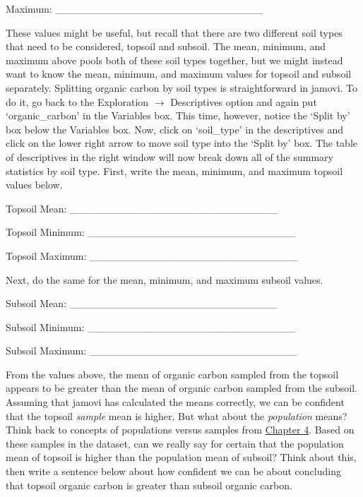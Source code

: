 \documentclass[
  openany]{scrbook}
\begin{document}
Maximum: \_\_\_\_\_\_\_\_\_\_\_\_\_\_\_\_\_\_\_\_\_\_\_\_\_\_\_\_

These values might be useful, but recall that there are two different soil types that need to be considered, topsoil and subsoil.
The mean, minimum, and maximum above pools both of these soil types together, but we might instead want to know the mean, minimum, and maximum values for topsoil and subsoil separately.
Splitting organic carbon by soil types is straightforward in jamovi.
To do it, go back to the Exploration \(\to\) Descriptives option and again put `organic\_carbon' in the Variables box.
This time, however, notice the `Split by' box below the Variables box.
Now, click on `soil\_type' in the descriptives and click on the lower right arrow to move soil type into the `Split by' box.
The table of descriptives in the right window will now break down all of the summary statistics by soil type.
First, write the mean, minimum, and maximum topsoil values below.

Topsoil Mean: \_\_\_\_\_\_\_\_\_\_\_\_\_\_\_\_\_\_\_\_\_\_\_\_\_\_\_\_

Topsoil Minimum: \_\_\_\_\_\_\_\_\_\_\_\_\_\_\_\_\_\_\_\_\_\_\_\_\_\_\_\_

Topsoil Maximum: \_\_\_\_\_\_\_\_\_\_\_\_\_\_\_\_\_\_\_\_\_\_\_\_\_\_\_\_

Next, do the same for the mean, minimum, and maximum subsoil values.

Subsoil Mean: \_\_\_\_\_\_\_\_\_\_\_\_\_\_\_\_\_\_\_\_\_\_\_\_\_\_\_\_

Subsoil Minimum: \_\_\_\_\_\_\_\_\_\_\_\_\_\_\_\_\_\_\_\_\_\_\_\_\_\_\_\_

Subsoil Maximum: \_\_\_\_\_\_\_\_\_\_\_\_\_\_\_\_\_\_\_\_\_\_\_\_\_\_\_\_

From the values above, the mean of organic carbon sampled from the topsoil appears to be greater than the mean of organic carbon sampled from the subsoil.
Assuming that jamovi has calculated the means correctly, we can be confident that the topsoil \emph{sample} mean is higher.
But what about the \emph{population} means?
Think back to concepts of populations versus samples from \protect\hyperlink{Chapter_4}{Chapter 4}.
Based on these samples in the dataset, can we really say for certain that the population mean of topsoil is higher than the population mean of subsoil?
Think about this, then write a sentence below about how confident we can be about concluding that topsoil organic carbon is greater than subsoil organic carbon.

\begin{verbatim}




\end{verbatim}
\end{document}
